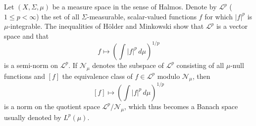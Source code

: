 Let $(X, \Sigma, \mu)$ be a measure space in the sense of Halmos. Denote by $\mathscr{L}^p$ ($1 \leq p < \infty$) the set of all $\Sigma$-measurable, scalar-valued functions $f$ for which $|f|^p$ is $\mu$-integrable. The inequalities of H\"older and Minkowski show that $\mathscr{L}^p$ is a vector space and that
$$f \mapsto \left(\int |f|^p \,d\mu\right)^{1/p}$$
is a semi-norm on $\mathscr{L}^p$. If $\mathcal{N}_\mu$ denotes the subspace of $\mathscr{L}^p$ consisting of all $\mu$-null functions and $[f]$ the equivalence class of $f \in \mathscr{L}^p$ modulo $\mathcal{N}_\mu$, then
$$[f] \mapsto \left(\int |f|^p \,d\mu\right)^{1/p}$$
is a norm on the quotient space $\mathscr{L}^p / \mathcal{N}_\mu$, which thus becomes a Banach space usually denoted by $L^p(\mu)$.
